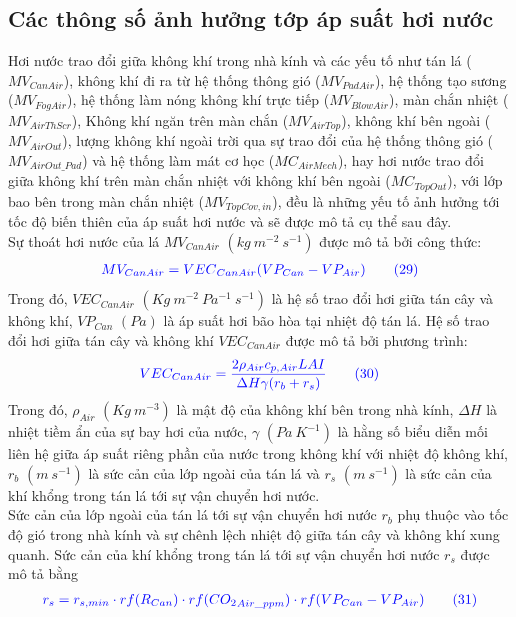 \documentclass[13pt,a4paper]{article}
\begin{document}
		\subsection{Các thông số ảnh hưởng tớp áp suất hơi nước}
			Hơi nước trao đổi giữa không khí trong nhà kính và các yếu tố như tán lá ($MV_{CanAir}$), không khí đi ra từ hệ thống thông gió ($MV_{PadAir}$), hệ thống tạo sương ($MV_{FogAir}$), hệ thống làm nóng không khí trực tiếp ($MV_{BlowAir}$), màn chắn nhiệt ($MV_{AirThScr}$), Không khí ngăn trên màn chắn ($MV_{AirTop}$), không khí bên ngoài ($MV_{AirOut}$), lượng không khí ngoài trời qua sự trao đổi của hệ thống thông gió ($MV_{AirOut\_Pad}$) và hệ thống làm mát cơ học ($MC_{AirMech}$), hay hơi nước trao đổi giữa không khí trên màn chắn nhiệt với không khí bên ngoài ($MC_{TopOut}$), với lớp bao bên trong màn chắn nhiệt ($MV_{TopCov,in}$), đều là những yếu tố ảnh hưởng tới tốc độ biến  thiên của áp suất hơi nước và sẽ được mô tả cụ thể sau đây.\\
			Sự thoát hơi nước của lá $MV_{CanAir}$ $(kg\ m^{-2}\ s^{-1})$ được mô tả bởi công thức:
			\begin{align}
				\color{blue}
					MV_{CanAir} = {VEC}_{CanAir}(VP_{Can} - VP_{Air})
				\color{blue}
				\tag{29}\label{vp3}
			\end{align}
			Trong đó, ${VEC}_{CanAir}$ $(Kg\ m^{-2}\ Pa^{-1}\ s^{-1})$ là hệ số trao đổi hơi giữa tán cây và không khí, $VP_{Can}$ $(Pa)$ là áp suất hơi bão hòa tại nhiệt độ tán lá. Hệ số trao đổi hơi giữa tán cây và không khí ${VEC}_{CanAir}$ được mô tả bởi phương trình:
			\begin{align}
				\color{blue}
					VEC_{CanAir} = \dfrac{2\rho_{Air}c_{p,Air}LAI}{\Delta H \gamma (r_b + r_s)}
				\color{blue}
				\tag{30}\label{vp4}
			\end{align}
			Trong đó, $\rho_{Air}$ $(Kg\ m^{-3})$ là mật độ của không khí bên trong nhà kính, $\Delta H$ là nhiệt tiềm ẩn của sự bay hơi của nước, $\gamma$ $(Pa\ K^{-1})$ là hằng số biểu diễn mối liên hệ giữa áp suất riêng phần của nước trong không khí với nhiệt độ không khí, $r_b$ $(m\ s^{-1})$ là sức cản của lớp ngoài của tán lá và $r_s$ $(m\ s^{-1})$ là sức cản của khí khổng trong tán lá tới sự vận chuyển hơi nước. \\
			Sức cản của lớp ngoài của tán lá tới sự vận chuyển hơi nước $r_b$ phụ thuộc vào tốc độ gió trong nhà kính và sự chênh lệch nhiệt độ giữa tán cây và không khí xung quanh. Sức cản của khí khổng trong tán lá tới sự vận chuyển hơi nước $r_s$ được mô tả bằng
			\begin{align}
				\color{blue}
					r_s = r_{s,min}\cdot rf(R_{Can})\cdot rf({CO_2}_{Air\_ppm}) \cdot rf(VP_{Can} - VP_{Air})
				\color{blue}
				\tag{31}\label{vp5}
			\end{align}
\end{document}
